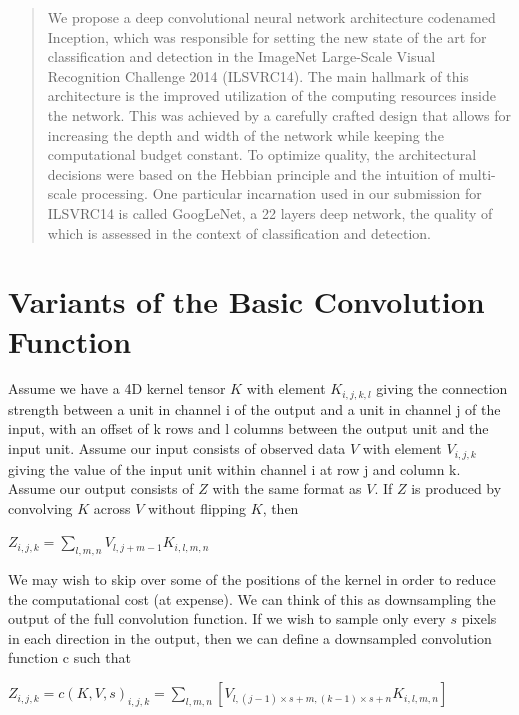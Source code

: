 \documentclass[onecolumn, letterpaper, 12pt]{report}
\begin{document}
\begin{quote}
  We propose a deep convolutional neural network architecture
  codenamed Inception, which was responsible for setting the new state
  of the art for classification and detection in the ImageNet
  Large-Scale Visual Recognition Challenge 2014 (ILSVRC14). The main
  hallmark of this architecture is the improved utilization of the
  computing resources inside the network. This was achieved by a
  carefully crafted design that allows for increasing the depth and
  width of the network while keeping the computational budget
  constant. To optimize quality, the architectural decisions were
  based on the Hebbian principle and the intuition of multi-scale
  processing. One particular incarnation used in our submission for
  ILSVRC14 is called GoogLeNet, a 22 layers deep network, the quality
  of which is assessed in the context of classification and detection.
\end{quote}

\section{Variants of the Basic Convolution Function}

Assume we have a 4D kernel tensor $K$ with element $K_{i, j, k, l}$ giving the connection strength between a unit in channel i of the output and a unit in channel j of the input, with an offset of k rows and l columns between the output unit and the input unit. Assume our input consists of observed data $V$ with element $V_{i,j,k}$ giving the value of the input unit within channel i at row j and column k. Assume our output consists of $Z$ with the same format as $V$. If $Z$ is produced by convolving $K$ across $V$ without flipping $K$, then 

\begin{center}
  $Z_{i, j, k} = \sum\limits_{l,m,n} V_{l, j+m-1}K_{i,l,m,n}$
\end{center}

We may wish to skip over some of the positions of the kernel in order to reduce the computational cost (at expense). We can think of this as downsampling the output of the full convolution function. If we wish to sample only every $s$ pixels in each direction in the output, then we can define a downsampled convolution function c such that 

\begin{center}
  $Z_{i, j, k} = c(K, V, s)_{i, j, k} = \sum\limits_{l, m, n}[V_{l, (j-1) \times s + m, (k-1) \times s+n}K_{i, l, m, n}]$
\end{center}
\end{document}
